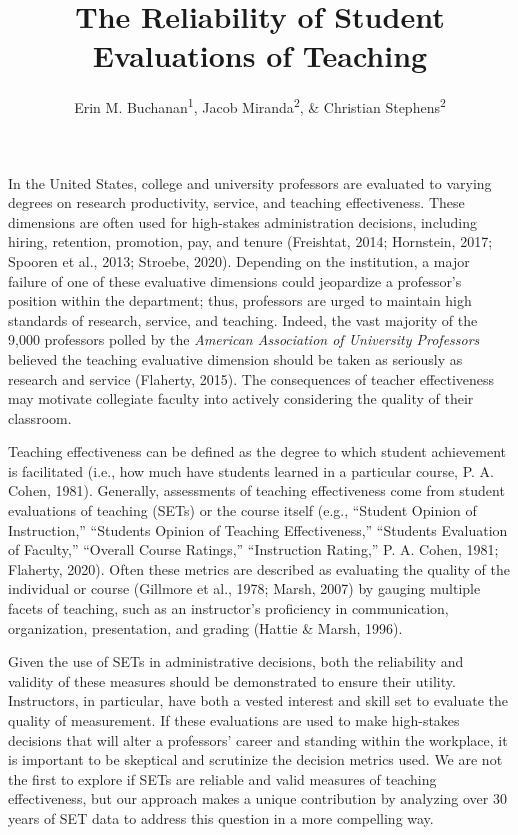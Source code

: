 \documentclass[
  man,mask]{apa7}
\title{The Reliability of Student Evaluations of Teaching}
\author{Erin M. Buchanan\textsuperscript{1}, Jacob Miranda\textsuperscript{2}, \& Christian Stephens\textsuperscript{2}}
\date{}
\affiliation{\vspace{0.5cm}\textsuperscript{1} Harrisburg University of Science and Technology\\\textsuperscript{2} University of Alabama}
\begin{document}
\maketitle

In the United States, college and university professors are
evaluated to varying degrees on research productivity, service, and
teaching effectiveness. These dimensions are often used for high-stakes
administration decisions, including hiring, retention, promotion, pay,
and tenure (Freishtat, 2014; Hornstein, 2017; Spooren et al., 2013; Stroebe, 2020).
Depending on the institution, a major failure of one of these evaluative
dimensions could jeopardize a professor's position within the
department; thus, professors are urged to maintain high standards of
research, service, and teaching. Indeed, the vast majority of the 9,000
professors polled by the \emph{American Association of University Professors}
believed the teaching evaluative dimension should be taken as seriously
as research and service (Flaherty, 2015). The consequences of teacher
effectiveness may motivate collegiate faculty into actively considering
the quality of their classroom.

Teaching effectiveness can be defined as the degree to which student
achievement is facilitated (i.e., how much have students learned in a
particular course, P. A. Cohen, 1981). Generally, assessments of teaching
effectiveness come from student evaluations of teaching (SETs) or the
course itself (e.g., ``Student Opinion of Instruction,'' ``Students Opinion
of Teaching Effectiveness,'' ``Students Evaluation of Faculty,'' ``Overall
Course Ratings,'' ``Instruction Rating,'' P. A. Cohen, 1981; Flaherty, 2020). Often
these metrics are described as evaluating the quality of the individual
or course (Gillmore et al., 1978; Marsh, 2007) by gauging multiple facets of teaching, such as an instructor's proficiency in communication, organization, presentation, and grading (Hattie \& Marsh, 1996).

Given the use of SETs in administrative decisions, both the reliability and validity of these measures should be demonstrated to ensure their utility. Instructors, in particular, have both a vested interest and skill set to evaluate the quality of measurement. If these evaluations are used to make high-stakes decisions that will alter a professors' career and standing within the workplace, it is important to be skeptical and scrutinize the decision metrics used. We are not the first to explore if SETs are reliable and valid measures of teaching effectiveness, but our approach makes a unique contribution by analyzing over 30 years of SET data to address this question in a more compelling way.
\end{document}
